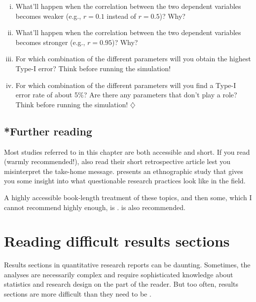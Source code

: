 \documentclass[a4paper]{tufte-book}\usepackage[]{graphicx}\usepackage[]{xcolor}
\newcommand*{\parend}[1][$\diamondsuit$]{%
\leavevmode\unskip\penalty9999 \hbox{}\nobreak\hfill
    \quad\hbox{#1}%
}
\begin{document}
\begin{enumerate}[(a)]
\begin{enumerate}[i.]
    \item What'll happen when the correlation between the two 
    dependent variables becomes weaker (e.g., $r = 0.1$ instead
    of $r = 0.5$)? Why?
    
    \item What'll happen when the correlation between the two
    dependent variables becomes stronger (e.g., $r = 0.95$)? Why?
    
    \item For which combination of the different parameters will
    you obtain the highest Type-I error? Think before running the simulation!
    
    \item For which combination of the different parameters will
    you find a Type-I error rate of about 5\%? Are there any
    parameters that don't play a role? Think before running the simulation! \parend
  \end{enumerate}
\end{enumerate}

\section{*Further reading}

Most studies referred to in this chapter are both accessible and short.
If you read \citet{Simmons2011} (warmly recommended!),
also read their short retrospective article \citep{Simmons2018}
lest you misinterpret the take-home message.
\citet{Peterson2016} presents an ethnographic study that gives
you some insight into what questionable research practices look like
in the field.

A highly accessible book-length treatment of these topics, and then some,
which I cannot recommend highly enough, is \citet{Ritchie2021}.
\citet{Chambers2017} is also recommended.

% 

\appendix

\chapter{Reading difficult results sections}
Results sections in quantitative research reports can be daunting.
Sometimes, the analyses are necessarily complex 
and require sophisticated knowledge about statistics and research
design on the part of the reader.
But too often, results sections are more difficult than they need
to be \citep[see][]{Vanhove2020b}. 
\end{document}
